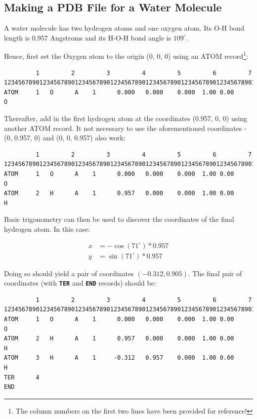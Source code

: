 \documentclass[
  letterpaper,
  DIV=11,
  numbers=noendperiod]{scrreprt}
\begin{document}
\hypertarget{making-a-pdb-file-for-a-water-molecule}{%
\subsection{Making a PDB File for a Water
Molecule}\label{making-a-pdb-file-for-a-water-molecule}}

A water molecule has two hydrogen atoms and one oxygen atom. Its O-H
bond length is 0.957 Angstroms and its H-O-H bond angle is
\(109^\circ\).

Hence, first set the Oxygen atom to the origin (0, 0, 0) using an ATOM
record\footnote{The column numbers on the first two lines have been
  provided for reference!}:

\begin{verbatim}
         1         2         3         4         5         6         7
1234567890123456789012345678901234567890123456789012345678901234567890123456789
ATOM     1   O      A    1      0.000   0.000    0.000  1.00 0.00            O
\end{verbatim}

Thereafter, add in the first hydrogen atom at the coordinates (0.957, 0,
0) using another ATOM record. It not necessary to use the aforementioned
coordinates - (0, 0.957, 0) and (0, 0, 0.957) also work:

\begin{verbatim}
         1         2         3         4         5         6         7
1234567890123456789012345678901234567890123456789012345678901234567890123456789
ATOM     1   O      A    1      0.000   0.000    0.000  1.00 0.00            O
ATOM     2   H      A    1      0.957   0.000    0.000  1.00 0.00            H
\end{verbatim}

Basic trigonometry can then be used to discover the coordinates of the
final hydrogen atom. In this case:

\begin{align}
  x &= -\cos(71^\circ) * 0.957 \\ 
  y &= \sin(71^\circ) * 0.957
\end{align}

Doing so should yield a pair of coordinates \((-0.312, 0.905)\). The
final pair of coordinates (with \textbf{\texttt{TER}} and
\textbf{\texttt{END}} records) should be:

\begin{verbatim}
         1         2         3         4         5         6         7
1234567890123456789012345678901234567890123456789012345678901234567890123456789
ATOM     1   O      A    1      0.000   0.000    0.000  1.00 0.00            O
ATOM     2   H      A    1      0.957   0.000    0.000  1.00 0.00            H
ATOM     3   H      A    1     -0.312   0.957    0.000  1.00 0.00            H
TER      4
END 
\end{verbatim}
\end{document}
